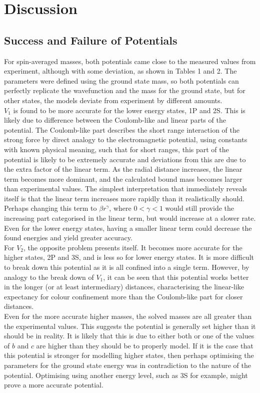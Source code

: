 \documentclass[10pt, twocolumn]{article}
\begin{document}
\section{Discussion}
\subsection{Success and Failure of Potentials}
For spin-averaged masses, both potentials came close to the measured values from experiment, although with some deviation, as shown in Tables 1 and 2.
The parameters were defined using the ground state mass, so both potentials can perfectly replicate the wavefunction and the mass for the ground state, but for other states, the models deviate from experiment by different amounts. \\
$V_1$ is found to be more accurate for the lower energy states, 1P and 2S. 
This is likely due to difference between the Coulomb-like and linear parts of the potential. 
The Coulomb-like part describes the short range interaction of the strong force by direct analogy to the electromagnetic potential, using constants with known physical meaning, such that for short ranges, this part of the potential is likely to be extremely accurate and deviations from this are due to the extra factor of the linear term. 
As the radial distance increases, the linear term becomes more dominant, and the calculated bound mass becomes larger than experimental values. 
The simplest interpretation that immediately reveals itself is that the linear term increases more rapidly than it realistically should. 
Perhaps changing this term to $\beta r^\gamma$, where $0 < \gamma < 1$ would still provide the increasing part categorised in the linear term, but would increase at a slower rate.
Even for the lower energy states, having a smaller linear term could decrease the found energies and yield greater accuracy. \\
For $V_2$, the opposite problem presents itself. 
It becomes more accurate for the higher states, 2P and 3S, and is less so for lower energy states. 
It is more difficult to break down this potential as it is all confined into a single term.
However, by analogy to the break down of $V_1$, it can be seen that this potential works better in the longer (or at least intermediary) distances, characterising the linear-like expectancy for colour confinement more than the Coulomb-like part for closer distances. \\
Even for the more accurate higher masses, the solved masses are all greater than the experimental values. 
This suggests the potential is generally set higher than it should be in reality. 
It is likely that this is due to either both or one of the values of $b$ and $c$ are higher than they should be to properly model. 
If it is the case that this potential is stronger for modelling higher states, then perhaps optimising the parameters for the ground state energy was in contradiction to the nature of the potential.  Optimising using another energy level, such as 3S for example, might prove a more accurate potential.
\end{document}
